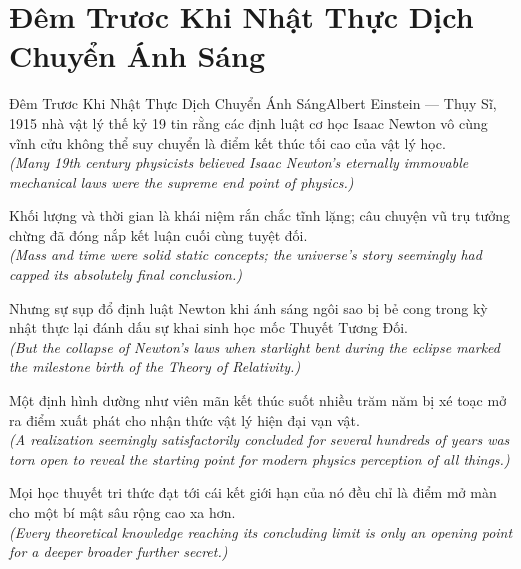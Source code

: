 \section{Đêm Trươc Khi Nhật Thực Dịch Chuyển Ánh Sáng}
\begin{truyen}{Đêm Trươc Khi Nhật Thực Dịch Chuyển Ánh Sáng}{Albert Einstein --- Thụy Sĩ, 1915}
 nhà vật lý thế kỷ 19 tin rằng các định luật cơ học Isaac Newton vô cùng vĩnh cửu không thể suy chuyển là điểm kết thúc tối cao của vật lý học.\\[4pt]
\textit{(Many 19th century physicists believed Isaac Newton's eternally immovable mechanical laws were the supreme end point of physics.)}

Khối lượng và thời gian là khái niệm rắn chắc tĩnh lặng; câu chuyện vũ trụ tưởng chừng đã đóng nắp kết luận cuối cùng tuyệt đối.\\[4pt]
\textit{(Mass and time were solid static concepts; the universe's story seemingly had capped its absolutely final conclusion.)}

Nhưng sự sụp đổ định luật Newton khi ánh sáng ngôi sao bị bẻ cong trong kỳ nhật thực lại đánh dấu sự khai sinh học mốc Thuyết Tương Đối.\\[4pt]
\textit{(But the collapse of Newton's laws when starlight bent during the eclipse marked the milestone birth of the Theory of Relativity.)}

Một định hình dường như viên mãn kết thúc suốt nhiều trăm năm bị xé toạc mở ra điểm xuất phát cho nhận thức vật lý hiện đại vạn vật.\\[4pt]
\textit{(A realization seemingly satisfactorily concluded for several hundreds of years was torn open to reveal the starting point for modern physics perception of all things.)}

\end{truyen}
\begin{baihoc}
  Mọi học thuyết tri thức đạt tới cái kết giới hạn của nó đều chỉ là điểm mở màn cho một bí mật sâu rộng cao xa hơn.\\[4pt]
  \textit{(Every theoretical knowledge reaching its concluding limit is only an opening point for a deeper broader further secret.)}
\end{baihoc}

